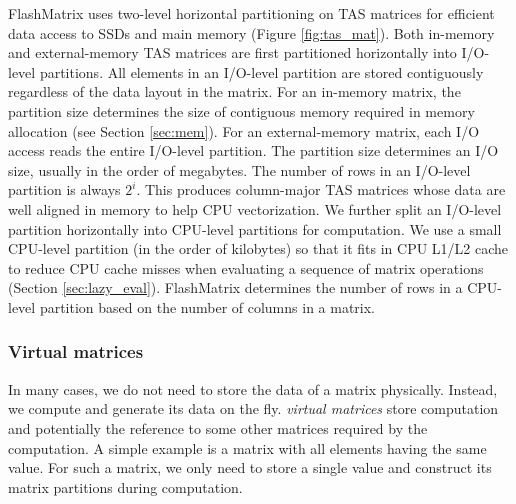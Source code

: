 FlashMatrix uses two-level horizontal partitioning on TAS matrices for efficient
data access to SSDs and main memory (Figure \ref{fig:tas_mat}). Both in-memory
and external-memory TAS matrices are first partitioned horizontally into
I/O-level partitions. All elements in an I/O-level partition are stored
contiguously regardless of the data layout in the matrix. For an in-memory matrix,
the partition size determines the size of contiguous memory required in memory
allocation (see Section \ref{sec:mem}). For an external-memory matrix, each I/O
access reads the entire I/O-level partition. The partition size determines an I/O
size, usually in the order of megabytes. The number of rows in an I/O-level
partition is always $2^i$. This produces column-major TAS matrices whose data
are well aligned in memory to help CPU vectorization.
We further split an I/O-level partition
horizontally into CPU-level partitions for computation. We use a small
CPU-level partition (in the order of kilobytes) so that it fits in CPU L1/L2
cache to reduce CPU cache misses when evaluating a sequence of matrix
operations (Section \ref{sec:lazy_eval}). FlashMatrix determines the number
of rows in a CPU-level partition based on the number of columns in a matrix.


\subsubsection{Virtual matrices} \label{virt_mat}
In many cases, we do not need to store the data of a matrix physically. Instead,
we compute and generate its data on the fly. \textit{virtual matrices} store
computation and potentially the reference
to some other matrices required by the computation. A simple example is a matrix
with all elements having the same value. For such a matrix, we only need to store
a single value and construct its matrix partitions during computation.

